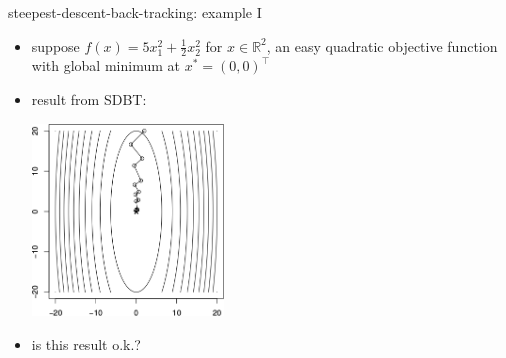 \documentclass[10pt,hyperref]{beamer}
\newcommand{\RR}{\mathbb{R}}
\begin{document}
\begin{frame}{steepest-descent-back-tracking: example I}

\begin{itemize}
\item suppose $f(x) = 5 x_1^2 + \frac{1}{2} x_2^2$ for $x\in\RR^2$, an easy quadratic objective function with global minimum at $x^*=(0,0)^\top$
\item result from SDBT:

\begin{center}
\includegraphics[width=0.4\textwidth]{egg-sd-backtracking}
\end{center}

\medskip
\item is this result o.k.?
\end{itemize}
\end{frame}
\end{document}
